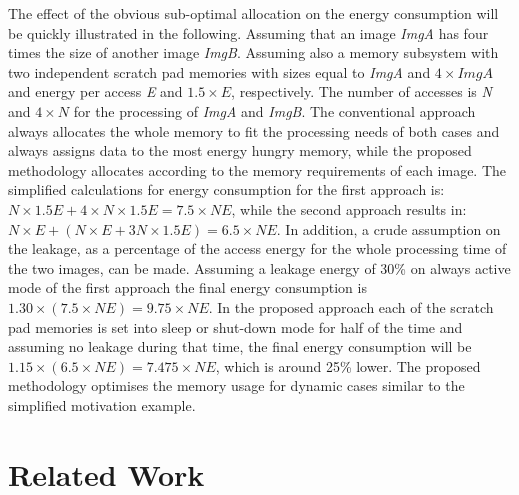 \documentclass[a4paper,conference]{IEEEtran}
\begin{document}
The effect of the obvious sub-optimal allocation on the energy consumption will be quickly illustrated in the following. Assuming that an image \textit{ImgA} has four times the size of another image \textit{ImgB}. Assuming also a memory subsystem with two independent scratch pad memories with sizes equal to \textit{ImgA} and $4 \times \textit{ImgA}$ and energy per access \textit{E} and $1.5 \times E$, respectively. The number of accesses is \textit{N} and $ 4 \times N$ for the processing of \textit{ImgA} and \textit{ImgB}. The conventional approach always allocates the whole memory to fit the processing needs of both cases and always assigns data to the most energy hungry memory, while the proposed methodology allocates according to the memory requirements of each image. The simplified calculations for energy consumption for the first approach is: \begin{math}N \times 1.5E + 4 \times N \times 1.5E = 7.5 \times NE\end{math}, while the second approach results in: \begin{math}N \times E + ( N \times E + 3N \times 1.5E ) = 6.5 \times NE \end{math}. In addition, a crude assumption on the leakage, as a percentage of the access energy for the whole processing time of the two images, can be made. Assuming a leakage energy of 30\% on always active mode of the first approach the final energy consumption is $ 1.30 \times ( 7.5 \times NE )  = 9.75 \times NE$. In the proposed approach each of the scratch pad memories is set into sleep or shut-down mode for half of the time and assuming no leakage during that time, the final energy consumption will be $ 1.15 \times ( 6.5 \times NE )  = 7.475 \times NE$, which is around 25\% lower. The proposed methodology optimises the memory usage for dynamic cases similar to the simplified motivation example.



\section{Related Work}
\label{sec:related}
\end{document}

